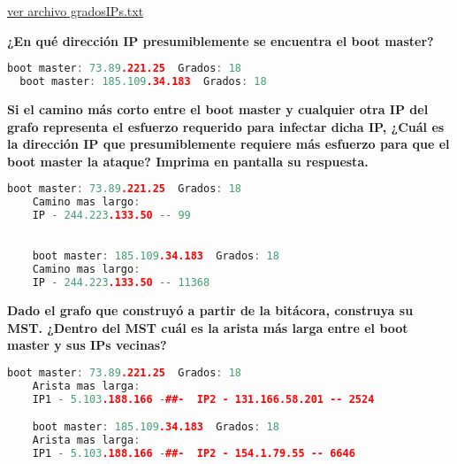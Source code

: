 \documentclass{article}
\begin{document}
\begin{warn}[]
  \href{https://github.com/luisballado/ADA/blob/main/practice_code/problem_exam/gradosIPs.txt}{ver archivo gradosIPs.txt}\\   
\end{warn}

\begin{question}
  \textbf{¿En qué dirección IP presumiblemente se encuentra el boot master?}
\end{question}

\begin{file}
\begin{lstlisting}[language=C++]
  boot master: 73.89.221.25  Grados: 18
  boot master: 185.109.34.183  Grados: 18
\end{lstlisting}
\end{file}

\begin{question}
  \textbf{Si el camino más corto entre el boot master y cualquier otra IP del grafo representa el esfuerzo requerido para infectar dicha IP, ¿Cuál es la dirección IP que presumiblemente requiere más esfuerzo para que el boot master la ataque? Imprima en pantalla su respuesta.}
\end{question}

\begin{file}
  \begin{lstlisting}[language=C++]
    boot master: 73.89.221.25  Grados: 18
    Camino mas largo: 
    IP - 244.223.133.50 -- 99

    
    boot master: 185.109.34.183  Grados: 18
    Camino mas largo: 
    IP - 244.223.133.50 -- 11368
  \end{lstlisting}
\end{file}

\begin{question}
  \textbf{Dado el grafo que construyó a partir de la bitácora, construya su MST. ¿Dentro del MST cuál es la arista más larga entre el boot master y sus IPs vecinas?}
\end{question}

\begin{file}
  \begin{lstlisting}[language=C++]
    boot master: 73.89.221.25  Grados: 18
    Arista mas larga: 
    IP1 - 5.103.188.166 -##-  IP2 - 131.166.58.201 -- 2524

    boot master: 185.109.34.183  Grados: 18
    Arista mas larga: 
    IP1 - 5.103.188.166 -##-  IP2 - 154.1.79.55 -- 6646
  \end{lstlisting}
\end{file}
\end{document}
